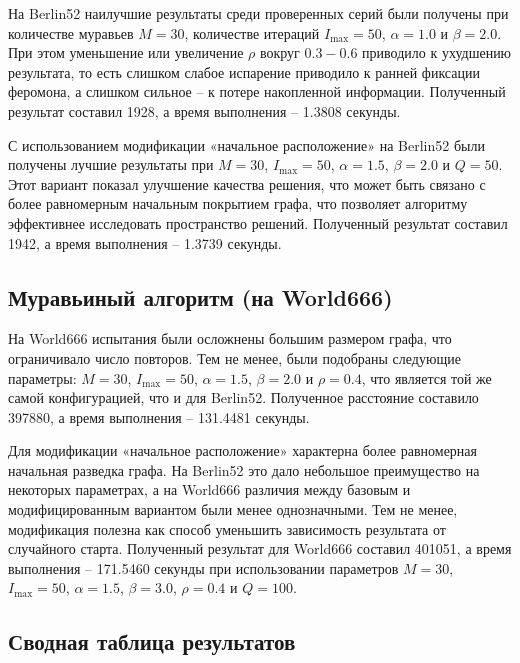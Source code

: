 \documentclass[12pt,a4paper]{article}
\begin{document}
На Berlin52 наилучшие результаты среди проверенных серий были получены при количестве
муравьев $M=30$, количестве итераций $I_{\max}=50$,
$\alpha = 1.0$ и $\beta = 2.0$. При этом уменьшение или увеличение $\rho$ вокруг
$0.3-0.6$ приводило к ухудшению результата, то есть слишком слабое испарение приводило к
ранней фиксации феромона, а слишком сильное -- к потере накопленной информации. Полученный
результат составил 1928, а время выполнения -- 1.3808 секунды.

С использованием модификации «начальное расположение» на Berlin52 были получены лучшие
результаты при $M=30$, $I_{\max}=50$, $\alpha = 1.5$, $\beta = 2.0$ и $Q = 50$.
Этот вариант показал улучшение качества решения, что может быть связано с более
равномерным начальным покрытием графа, что позволяет алгоритму эффективнее исследовать
пространство решений. Полученный результат составил 1942,
а время выполнения -- 1.3739 секунды.

\subsection{Муравьиный алгоритм (на World666)}

На World666 испытания были осложнены большим размером графа, что ограничивало число повторов.
Тем не менее, были подобраны следующие параметры: $M=30$, $I_{\max}=50$, $\alpha = 1.5$,
$\beta = 2.0$ и $\rho = 0.4$, что является той же самой конфигурацией, что и для Berlin52.
Полученное расстояние составило 397880, а время выполнения -- 131.4481 секунды.

Для модификации «начальное расположение» характерна более равномерная начальная
разведка графа. На Berlin52 это дало небольшое преимущество на некоторых параметрах,
а на World666 различия между базовым и модифицированным вариантом были менее
однозначными. Тем не менее, модификация полезна как способ уменьшить зависимость
результата от случайного старта. Полученный результат для World666 составил 401051,
а время выполнения -- 171.5460 секунды при использовании параметров $M=30$,
$I_{\max}=50$, $\alpha = 1.5$, $\beta = 3.0$, $\rho = 0.4$ и $Q = 100$.

\subsection{Сводная таблица результатов}
\end{document}
